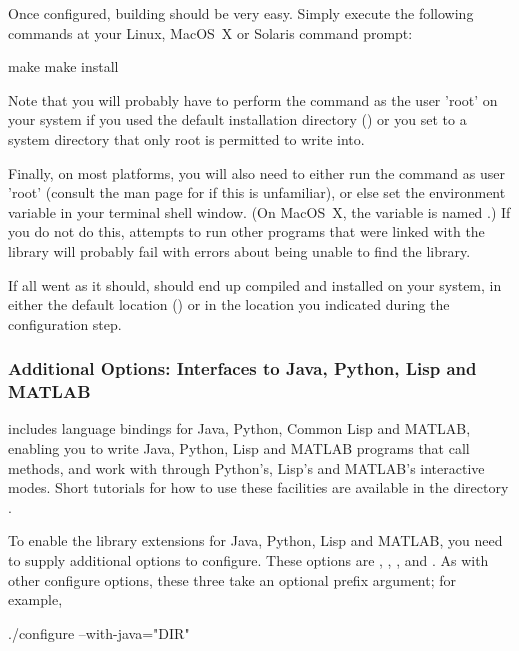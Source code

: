\documentclass{sbmlmanual}
\begin{document}
Once configured, building should be very easy.  Simply execute the
following commands at your Linux, MacOS~X or Solaris command prompt:

\begin{shellVerbatim}
  make
  make install
\end{shellVerbatim}

Note that you will probably have to perform the 
command as the user 'root' on your system if you used the default
installation directory () or you set  to
a system directory that only root is permitted to write into.

Finally, on most platforms, you will also need to either run the command
 as user 'root' (consult the man page for 
if this is unfamiliar), or else set the environment variable
 in your terminal shell window.  (On MacOS~X, the
variable is named .)  If you do not do this,
attempts to run other programs that were linked with the \libsbml{} library
will probably fail with errors about being unable to find the library.

If all went as it should, \libsbml{} should end up compiled and installed
on your system, in either the default location () or in
the location you indicated during the configuration step.


\subsubsection{Additional Options: Interfaces to Java, Python, Lisp and MATLAB}

\libsbml{} includes language bindings for Java, Python, Common Lisp and
MATLAB, enabling you to write Java, Python, Lisp and MATLAB programs that
call \libsbml{} methods, and work with \libsbml{} through Python's, Lisp's
and MATLAB's interactive modes.  Short tutorials for how to use these
facilities are available in the directory .

To enable the library extensions for Java, Python, Lisp and MATLAB, you
need to supply additional options to configure.  These options are
, , , and
.  As with other configure options, these three take
an optional prefix argument; for example,

\begin{shellVerbatim}
  ./configure --with-java="DIR"
\end{shellVerbatim}
\end{document}
